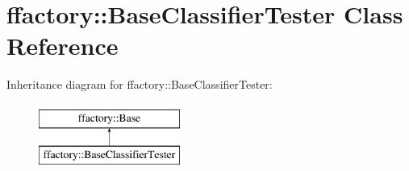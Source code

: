 \hypertarget{classffactory_1_1_base_classifier_tester}{\section{ffactory\-:\-:Base\-Classifier\-Tester Class Reference}
\label{classffactory_1_1_base_classifier_tester}
}
Inheritance diagram for ffactory\-:\-:Base\-Classifier\-Tester\-:\begin{figure}[H]
\begin{center}
\leavevmode
\includegraphics[height=2.000000cm]{classffactory_1_1_base_classifier_tester}
\end{center}
\end{figure}
